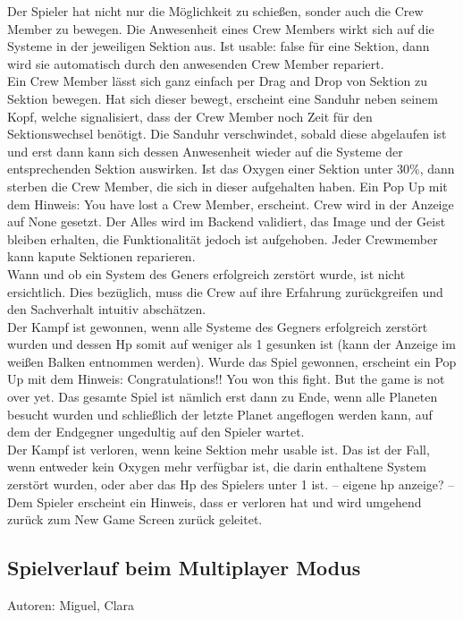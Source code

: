 \documentclass[fontsize=12pt,paper=a4,twoside]{scrartcl}
\begin{document}
Der Spieler hat nicht nur die Möglichkeit zu schießen, sonder auch die Crew Member zu bewegen.
Die Anwesenheit eines Crew Members wirkt sich auf die Systeme in der jeweiligen Sektion aus.
Ist usable: false für eine Sektion, dann wird sie automatisch durch den anwesenden Crew Member repariert.\\
 Ein Crew Member lässt sich ganz einfach per Drag and Drop von Sektion zu Sektion bewegen.
Hat sich dieser bewegt, erscheint eine Sanduhr neben seinem Kopf, welche signalisiert, dass der Crew Member noch Zeit für den Sektionswechsel benötigt. Die Sanduhr verschwindet, sobald diese abgelaufen ist
 und erst dann kann sich dessen Anwesenheit wieder auf die Systeme der entsprechenden Sektion auswirken. Ist das Oxygen einer Sektion unter 30\%, dann sterben die Crew Member, die sich in dieser aufgehalten haben. Ein Pop Up mit dem Hinweis: You have lost a Crew Member, erscheint. Crew wird in der Anzeige auf None gesetzt.
Der Alles wird im Backend validiert, das Image und der Geist bleiben erhalten, die Funktionalität jedoch ist aufgehoben. Jeder Crewmember kann kapute Sektionen reparieren.\\

Wann und ob ein System des Geners erfolgreich zerstört wurde, ist nicht ersichtlich.
Dies bezüglich, muss die Crew auf ihre Erfahrung zurückgreifen und den Sachverhalt intuitiv abschätzen.\\

Der Kampf ist gewonnen, wenn alle Systeme des Gegners erfolgreich zerstört wurden und dessen Hp somit auf weniger als 1 gesunken ist (kann der Anzeige im weißen Balken entnommen werden).
Wurde das Spiel gewonnen, erscheint ein Pop Up mit dem Hinweis: Congratulations!! You won this fight. But 
the game is not over yet. Das gesamte Spiel ist nämlich erst dann zu Ende, wenn alle Planeten besucht wurden und schließlich der letzte Planet angeflogen werden kann, auf dem der Endgegner ungedultig auf den Spieler wartet.\\

Der Kampf ist verloren, wenn keine Sektion mehr usable ist. Das ist der Fall, wenn entweder kein Oxygen mehr verfügbar ist, die darin enthaltene System zerstört wurden, oder aber das Hp des Spielers unter 1 ist.
-- eigene hp anzeige? --
Dem Spieler erscheint ein Hinweis, dass er verloren hat und wird umgehend zurück zum New Game Screen
zurück geleitet.\\


\subsection{Spielverlauf beim Multiplayer Modus}
Autoren: Miguel, Clara\\
\end{document}
